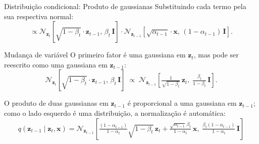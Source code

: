 \documentclass[aspectratio=169,xcolor=dvipsnames]{beamer}
\begin{document}
  \begin{frame}{Distribuição condicional: Produto de gaussianas}
    Substituindo cada termo pela sua respectiva normal:
    \[
      \propto
      \mathcal{N}_{\mathbf{z}_t}\!\left[\sqrt{1 - \beta_t}\cdot \mathbf{z}_{t-1},\, \beta_t\,\mathbf{I}\right]
      \cdot
      \mathcal{N}_{\mathbf{z}_{t-1}}\!\left[\sqrt{\alpha_{t-1}}\cdot \mathbf{x},\, (1 - \alpha_{t-1})\,\mathbf{I}\right].
    \]
    \begin{alertblock}{Mudança de variável}
      O primeiro fator é uma gaussiana em $\mathbf{z}_t$, mas pode ser reescrito
      como uma gaussiana em $\mathbf{z}_{t-1}$:
      \[
        \mathcal{N}_{\mathbf{z}_t}\!\left[\sqrt{1 - \beta_t}\cdot \mathbf{z}_{t-1},\, \beta_t\,\mathbf{I}\right]
        \;\propto\;
        \mathcal{N}_{\mathbf{z}_{t-1}}\!\left[\tfrac{1}{\sqrt{1 - \beta_t}}\, \mathbf{z}_t,\;
        \tfrac{\beta_t}{1 - \beta_t}\,\mathbf{I}\right].
      \]
    \end{alertblock}
    O produto de duas gaussianas em $\mathbf{z}_{t-1}$ é proporcional a uma
    gaussiana em $\mathbf{z}_{t-1}$; como o lado esquerdo é uma distribuição, a
    normalização é automática:
    \[
      q(\mathbf{z}_{t-1} \mid \mathbf{z}_t, \mathbf{x}) = \mathcal{N}_{\mathbf{z}_{t-1}}\!\left[
        \tfrac{(1 - \alpha_{t-1})}{1 - \alpha_t}\sqrt{1 - \beta_t}\, \mathbf{z}_t
        + \tfrac{\sqrt{\alpha_{t-1}}\,\beta_t}{1 - \alpha_t}\, \mathbf{x},\;
        \tfrac{\beta_t (1 - \alpha_{t-1})}{1 - \alpha_t}\,\mathbf{I}
      \right]
    \]
  \end{frame}

\end{document}
